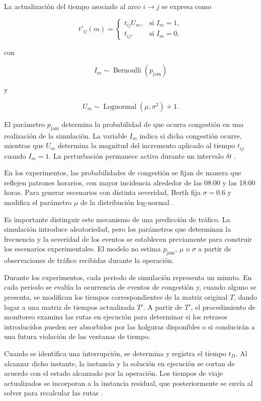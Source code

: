 \documentclass[11pt]{article}
\begin{document}
La actualización del tiempo asociado al arco \(i\rightarrow j\) se expresa como

\[
t'_{ij}(m)=
\begin{cases}
t_{ij}U_m, & \text{si } I_m=1,\\
t_{ij}, & \text{si } I_m=0,
\end{cases}
\]

con

\[
I_m\sim\operatorname{Bernoulli}(p_{\mathrm{jam}})
\]

y

\[
U_m\sim\operatorname{Lognormal}(\mu,\sigma^2)+1.
\]

El parámetro \(p_{\mathrm{jam}}\) determina la probabilidad de que ocurra congestión
en una realización de la simulación. La variable \(I_m\) indica si dicha congestión
ocurre, mientras que \(U_m\) determina la magnitud del incremento aplicado al tiempo
\(t_{ij}\) cuando \(I_m=1\). La perturbación permanece activa durante un intervalo
\(\delta t\) \parencite{berth_thesis_2025}.

En los experimentos, las probabilidades de congestión se fijan de manera que reflejen
patrones horarios, con mayor incidencia alrededor de las 08:00 y las 18:00 horas.
Para generar escenarios con distinta severidad, Berth fija \(\sigma=0.6\) y modifica
el parámetro \(\mu\) de la distribución log-normal
\parencite{berth_thesis_2025}.

Es importante distinguir este mecanismo de una predicción de tráfico. La simulación
introduce aleatoriedad, pero los parámetros que determinan la frecuencia y la
severidad de los eventos se establecen previamente para construir los escenarios
experimentales. El modelo no estima \(p_{\mathrm{jam}}\), \(\mu\) o \(\sigma\)
a partir de observaciones de tráfico recibidas durante la operación.

Durante los experimentos, cada periodo de simulación representa un minuto. En cada
periodo se evalúa la ocurrencia de eventos de congestión y, cuando alguno se presenta,
se modifican los tiempos correspondientes de la matriz original \(T\), dando lugar a
una matriz de tiempos actualizada \(T'\). A partir de \(T'\), el procedimiento de
monitoreo examina las rutas en ejecución para determinar si los retrasos introducidos
pueden ser absorbidos por las holguras disponibles o si conducirán a una futura
violación de las ventanas de tiempo.

Cuando se identifica una interrupción, se determina y registra el tiempo \(t_D\).
Al alcanzar dicho instante, la instancia y la solución en ejecución se cortan de acuerdo
con el estado alcanzado por la operación. Los tiempos de viaje actualizados se
incorporan a la instancia residual, que posteriormente se envía al solver para recalcular
las rutas \parencite{berth_thesis_2025}.
\end{document}
